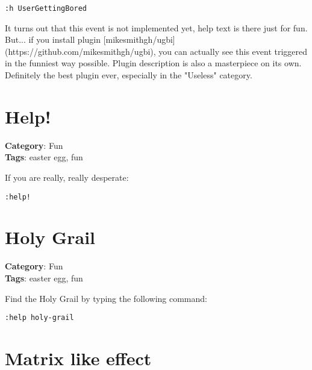 {{{{{{\begin{Exa*}{}
\begin{Verbatim}[fontsize=\footnotesize, breaklines, breakanywhere]
:h UserGettingBored
\end{Verbatim}
\end{Exa*}

It turns out that this event is not implemented yet, help text is there just for fun. But... if you install plugin [mikesmithgh/ugbi](https://github.com/mikesmithgh/ugbi), you can actually see this event triggered in the funniest way possible. Plugin description is also a masterpiece on its own. Definitely the best plugin ever, especially in the "Useless" category.

\section{Help!}

\textbf{Category}: Fun\\ \textbf{Tags}: easter egg, fun
\vspace{0.5cm}

If you are really, really desperate:

\begin{Exa*}{}
\begin{Verbatim}[fontsize=\footnotesize, breaklines, breakanywhere]
:help!
\end{Verbatim}
\end{Exa*}

\section{Holy Grail}

\textbf{Category}: Fun\\ \textbf{Tags}: easter egg, fun
\vspace{0.5cm}

Find the Holy Grail by typing the following command:

\begin{Exa*}{}
\begin{Verbatim}[fontsize=\footnotesize, breaklines, breakanywhere]
:help holy-grail
\end{Verbatim}
\end{Exa*}

\section{Matrix like effect}

}}}}}}
